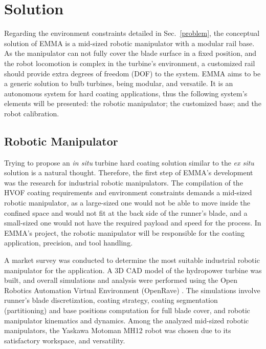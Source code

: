 \section{Solution}\label{solution}


Regarding the environment constraints detailed in Sec.~\ref{problem}, the
conceptual solution of EMMA is a mid-sized robotic manipulator with a modular
rail base. As the manipulator can not fully cover the blade surface in a
fixed position, and the robot locomotion is complex in the turbine's
environment, a customized rail should provide extra degrees of freedom (DOF) to
the system. EMMA aims to be a generic solution to bulb turbines, being modular,
and versatile. It is an autonomous system for hard coating applications, thus
the following system's elements will be presented: the robotic manipulator; the
customized base; and the robot calibration.


\subsection{Robotic Manipulator}\label{manipulator}
Trying to propose an \textit{in situ} turbine hard coating solution similar to
the \textit{ex situ} solution is a natural thought. Therefore, the first step of
EMMA's development was the research for industrial robotic manipulators. The
compilation of the HVOF coating requirements and environment constraints demands
a mid-sized robotic manipulator, as a large-sized one would not be able to move
inside the confined space and would not fit at the back side of the
runner's blade, and a small-sized one would not have the required payload and
speed for the process. In EMMA's project, the robotic manipulator will be
responsible for the coating application, precision, and tool handling.

A market survey was conducted to determine the most suitable industrial robotic
manipulator for the application. A 3D CAD model of the hydropower turbine was
built, and overall simu\-lations and analysis were performed using the Open
Robotics Automation Virtual Environment (OpenRave) \cite{diankov2008openrave}.
The simulations involve runner's blade discretization, coating strategy,
coating segmentation (partitioning) and base positions computation for full
blade cover, and robotic manipulator kinematics and dynamics. Among the
analyzed mid-sized robotic manipulators, the Yaskawa Motoman MH12\raisebox{1ex}{\textregistered}
robot was chosen due to its satisfactory workspace, and versatility.

